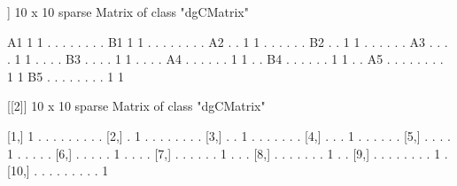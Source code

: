 \documentclass[11pt]{article}
\begin{document}
\begin{Schunk}
\begin{Soutput}
[[1]]
10 x 10 sparse Matrix of class "dgCMatrix"
                      
A1 1 1 . . . . . . . .
B1 1 1 . . . . . . . .
A2 . . 1 1 . . . . . .
B2 . . 1 1 . . . . . .
A3 . . . . 1 1 . . . .
B3 . . . . 1 1 . . . .
A4 . . . . . . 1 1 . .
B4 . . . . . . 1 1 . .
A5 . . . . . . . . 1 1
B5 . . . . . . . . 1 1

[[2]]
10 x 10 sparse Matrix of class "dgCMatrix"
                         
 [1,] 1 . . . . . . . . .
 [2,] . 1 . . . . . . . .
 [3,] . . 1 . . . . . . .
 [4,] . . . 1 . . . . . .
 [5,] . . . . 1 . . . . .
 [6,] . . . . . 1 . . . .
 [7,] . . . . . . 1 . . .
 [8,] . . . . . . . 1 . .
 [9,] . . . . . . . . 1 .
[10,] . . . . . . . . . 1
\end{Soutput}
\end{Schunk}
\end{document}
